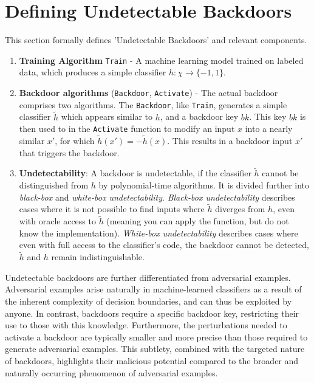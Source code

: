\documentclass[
	fontsize=12pt,
	headings=small,
	parskip=quarter,
	bibliography=totoc,
	numbers=noenddot,       
	open=any,               
 	final                   
]{scrreprt}
\begin{document}
\section{Defining Undetectable Backdoors}
This section formally defines 'Undetectable Backdoors' and relevant components.
\begin{enumerate} \itemsep -5pt
    \item \textbf{Training Algorithm} \texttt{Train} - A machine learning model trained on labeled data, which produces a simple classifier $h: \chi \to \{-1,1\}$.
    \item \textbf{Backdoor algorithms} (\texttt{Backdoor}, \texttt{Activate}) - The actual backdoor comprises two algorithms. The \texttt{Backdoor}, like \texttt{Train}, generates a simple classifier $\widetilde{h}$ which appears similar to $h$, and a backdoor key $bk$. This key $bk$ is then used to in the \texttt{Activate} function to modify an input $x$ into a nearly similar $x'$, for which $\widetilde{h}(x')=-\widetilde{h}(x)$. This results in a backdoor input $x'$ that triggers the backdoor.
    \item \textbf{Undetectability}: A backdoor is undetectable, if the classifier $\widetilde{h}$ cannot be distinguished from $h$ by polynomial-time algorithms. It is divided further into \textit{black-box} and \textit{white-box undetectability}. \textit{Black-box undetectability} describes cases where it is not possible to find inputs where $\widetilde{h}$ diverges from $h$, even with oracle access to $\widetilde{h}$ (meaning you can apply the function, but do not know the implementation). \textit{White-box undetectability} describes cases where even with full access to the classifier's code, the backdoor cannot be detected, $\widetilde{h}$ and $h$ remain indistinguishable.
\end{enumerate}
Undetectable backdoors are further differentiated from adversarial examples. Adversarial examples arise naturally in machine-learned classifiers as a result of the inherent complexity of decision boundaries, and can thus be exploited by anyone. In contrast, backdoors require a specific backdoor key, restricting their use to those with this knowledge. Furthermore, the perturbations needed to activate a backdoor are typically smaller and more precise than those required to generate adversarial examples. This subtlety, combined with the targeted nature of backdoors, highlights their malicious potential compared to the broader and naturally occurring phenomenon of adversarial examples.
\end{document}
